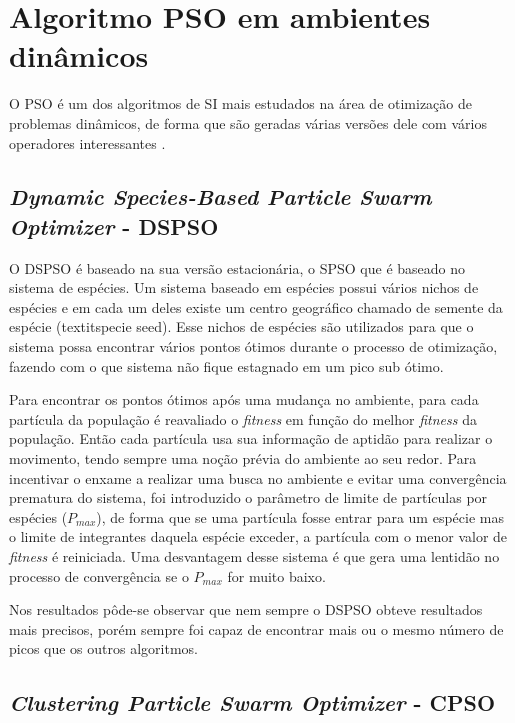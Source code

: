\section{Algoritmo PSO em ambientes dinâmicos}
\label{sec:pso_behaviour}

O PSO é um dos algoritmos de SI mais estudados na área de otimização de problemas dinâmicos, de forma que são geradas várias versões dele com vários operadores interessantes \cite{carlisle2002applying}.

\subsection{\textit{Dynamic Species-Based Particle Swarm Optimizer} - DSPSO}
\label{sec:dspso}

O DSPSO \cite{parrott2006locating} é baseado na sua versão estacionária, o SPSO que é baseado no sistema de espécies. Um sistema baseado em espécies possui vários nichos de espécies e em cada um deles existe um centro geográfico chamado de semente da espécie (textit{specie seed}). Esse nichos de espécies são utilizados para que o sistema possa encontrar vários pontos ótimos durante o processo de otimização, fazendo com o que sistema não fique estagnado em um pico sub ótimo.

Para encontrar os pontos ótimos após uma mudança no ambiente, para cada partícula da população é reavaliado o \textit{fitness} em função do melhor \textit{fitness} da população. Então cada partícula usa sua informação de aptidão para realizar o movimento, tendo sempre uma noção prévia do ambiente ao seu redor. Para incentivar o enxame a realizar uma busca no ambiente e evitar uma convergência prematura do sistema, foi introduzido o parâmetro de limite de partículas por espécies ($P_{max}$), de forma que se uma partícula fosse entrar para um espécie mas o limite de integrantes daquela espécie exceder, a partícula com o menor valor de \textit{fitness} é reiniciada. Uma desvantagem desse sistema é que gera uma lentidão no processo de convergência se o $P_{max}$ for muito baixo.

Nos resultados pôde-se observar que nem sempre o DSPSO obteve resultados mais precisos, porém sempre foi capaz de encontrar mais ou o mesmo número de picos que os outros algoritmos.

\subsection{\textit{Clustering Particle Swarm Optimizer} - CPSO}
\label{sec:cpso}

